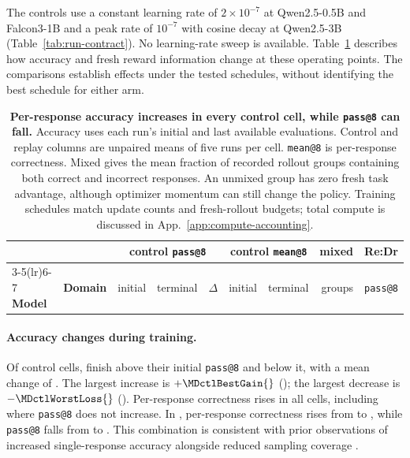 \documentclass{article}
\newcommand{\1}{\mathbf 1}
\theoremstyle{remark}
\theoremstyle{definition}
\theoremstyle{plain}
\begin{document}
The controls use a constant learning rate of $2\times10^{-7}$ at
Qwen2.5-0.5B and Falcon3-1B and a peak rate of $10^{-7}$ with cosine decay
at Qwen2.5-3B (Table~\ref{tab:run-contract}). No learning-rate sweep is
available. Table~\ref{tab:control-learning-audit} describes how accuracy and
fresh reward information change at these operating points. The comparisons
establish effects under the tested schedules, without identifying the best
schedule for either arm.

\begin{table}[t]
  \centering
  \caption{\textbf{Per-response accuracy increases in every control cell,
  while \texttt{pass@8} can fall.} Accuracy uses each run's initial and last
  available evaluations. Control and replay columns are unpaired means of
  five runs per cell. \texttt{mean@8} is per-response
  correctness. Mixed gives the mean fraction of recorded rollout groups
  containing both correct and incorrect responses. An unmixed group has
  zero fresh task advantage, although optimizer momentum can still change
  the policy. Training schedules match update counts and fresh-rollout
  budgets; total compute is discussed in App.~\ref{app:compute-accounting}.}
  \label{tab:control-learning-audit}
  \small
  \setlength{\tabcolsep}{5pt}
  \begin{tabular}{@{}llrrrrrrr@{}}
    \toprule
    & & \multicolumn{3}{c}{\textbf{control \texttt{pass@8}}}
      & \multicolumn{2}{c}{\textbf{control \texttt{mean@8}}}
      & \textbf{mixed} & \textbf{Re:Dr} \\
    \cmidrule(lr){3-5}\cmidrule(lr){6-7}
    \textbf{Model} & \textbf{Domain} & initial & terminal & $\Delta$
      & initial & terminal & groups & \texttt{pass@8} \\
    \midrule
    
  \end{tabular}
\end{table}

\paragraph{Accuracy changes during training.}
Of \MDctlCells{} control cells, \MDctlGains{} finish above their initial
\texttt{pass@8} and \MDctlLosses{} below it, with a mean change of
\MDctlMeanDelta{}. The largest increase is $+\MDctlBestGain{}$
(\MDctlBestGainCell{}); the largest decrease is $-\MDctlWorstLoss{}$
(\MDctlWorstLossCell{}). Per-response correctness rises in all
\MDctlMeanUp{} cells, including \MDctlYue{} where \texttt{pass@8} does not
increase. In \MDctlPatternCell{}, per-response correctness rises from
\MDctlPatternMeanFrom{} to \MDctlPatternMeanTo{}, while \texttt{pass@8}
falls from \MDctlPatternPassFrom{} to \MDctlPatternPassTo{}.
This combination is consistent with prior observations of increased
single-response accuracy alongside reduced sampling coverage
\citep{yue2025rlvrlimit}.
\end{document}
